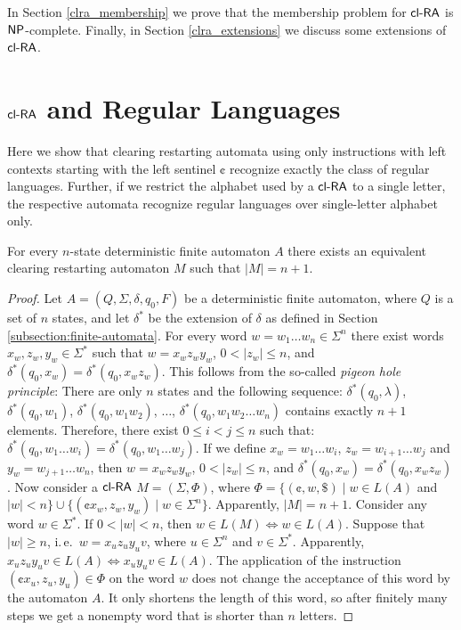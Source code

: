 In Section \ref{clra_membership} we prove that the membership problem for $\clRA$ is $\textup{\sf NP}$-complete. Finally, in Section \ref{clra_extensions} we discuss some extensions of $\clRA$.

\section[\texorpdfstring{$\clRA$ and Regular Languages}%
                        {cl-RA and REG}]%
                        {$\bm{\textup{\sf cl-RA\/}}$ and Regular Languages}\label{se:clRAandReg}

Here we show that clearing restarting automata using only instructions with left contexts starting with the left sentinel $\cent$ recognize exactly the class of regular languages. Further, if we restrict the alphabet used by a $\clRA$ to a single letter, the respective automata recognize regular languages over single-letter alphabet only.

\begin{theorem}\label{theorem:regular_to_clra}
For every $n$-state deterministic finite automaton $A$ there exists an equivalent  clearing restarting automaton $M$ such that $|M| = n+1$.
\end{theorem}

\begin{proof}
Let $A = (Q, \Sigma, \delta, q_0, F)$ be a deterministic finite automaton, where $Q$ is a set of $n$ states, and let $\delta^*$ be the extension of $\delta$ as defined in Section \ref{subsection:finite-automata}. For every word $w = w_1 \ldots w_n \in \Sigma^n$ there exist words $x_w, z_w, y_w \in \Sigma^*$ such that $w = x_w z_w y_w$, $0 < |z_w| \le n$, and $\delta^*(q_0, x_w) = \delta^*(q_0, x_w z_w)$. This follows from the so-called \emph{pigeon hole principle}: There are only $n$ states and the following sequence: $\delta^*(q_0, \lambda)$, $\delta^*(q_0, w_1)$, $\delta^*(q_0, w_1 w_2)$, $\ldots$, $\delta^*(q_0, w_1 w_2 \ldots w_n)$ contains exactly $n+1$ elements. Therefore, there exist $0 \le i < j \le n$ such that: $\delta^*(q_0, w_1 \ldots w_i) = \delta^*(q_0, w_1 \ldots w_j)$. If we define $x_w = w_1 \ldots w_i$, $z_w = w_{i+1} \ldots w_j$ and $y_w = w_{j+1} \ldots w_n$, then $w = x_w z_w y_w$, $0 < |z_w| \le n$, and $\delta^*(q_0, x_w) = \delta^*(q_0, x_w z_w)$. Now consider a $\clRA$ $M = (\Sigma, \Phi)$, where $\Phi = \{ (\cent, w, \$) \mid w \in L(A)$ and $|w| < n\} \cup \{(\cent x_w, z_w, y_w) \mid w \in \Sigma^n\}$. Apparently, $|M| = n + 1$. Consider any word $w \in \Sigma^*$. If $0 < |w| < n$, then $w \in L(M) \Leftrightarrow w \in L(A)$. Suppose that $|w| \ge n$, i.\,e.\ $w = x_u z_u y_u v$, where $u \in \Sigma^n$ and $v \in \Sigma^*$. Apparently, $x_u z_u y_u v \in L(A) \Leftrightarrow x_u y_u v \in L(A)$. The application of the instruction $(\cent x_u, z_u, y_u) \in \Phi$ on the word $w$ does not change the acceptance of this word by the automaton $A$. It only shortens the length of this word, so after finitely many steps we get a nonempty word that is shorter than $n$ letters.
\end{proof}

